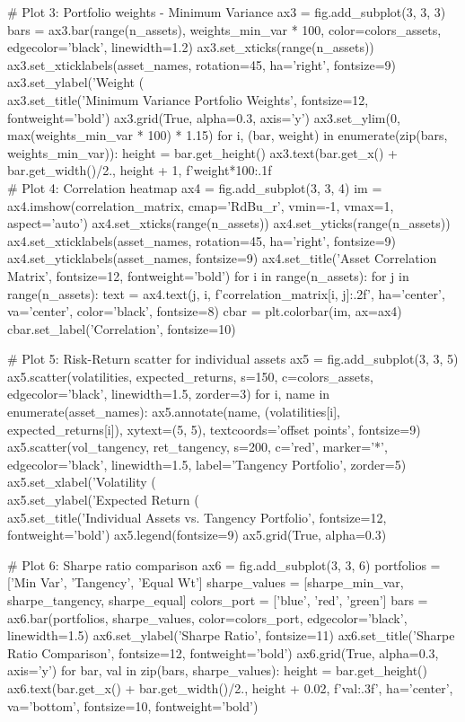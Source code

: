 \documentclass[a4paper, 11pt]{article}
\begin{document}
\begin{pycode}
# Plot 3: Portfolio weights - Minimum Variance
ax3 = fig.add_subplot(3, 3, 3)
bars = ax3.bar(range(n_assets), weights_min_var * 100, color=colors_assets,
              edgecolor='black', linewidth=1.2)
ax3.set_xticks(range(n_assets))
ax3.set_xticklabels(asset_names, rotation=45, ha='right', fontsize=9)
ax3.set_ylabel('Weight (\\%
ax3.set_title('Minimum Variance Portfolio Weights', fontsize=12, fontweight='bold')
ax3.grid(True, alpha=0.3, axis='y')
ax3.set_ylim(0, max(weights_min_var * 100) * 1.15)
for i, (bar, weight) in enumerate(zip(bars, weights_min_var)):
    height = bar.get_height()
    ax3.text(bar.get_x() + bar.get_width()/2., height + 1,
            f'{weight*100:.1f}\\%

# Plot 4: Correlation heatmap
ax4 = fig.add_subplot(3, 3, 4)
im = ax4.imshow(correlation_matrix, cmap='RdBu_r', vmin=-1, vmax=1, aspect='auto')
ax4.set_xticks(range(n_assets))
ax4.set_yticks(range(n_assets))
ax4.set_xticklabels(asset_names, rotation=45, ha='right', fontsize=9)
ax4.set_yticklabels(asset_names, fontsize=9)
ax4.set_title('Asset Correlation Matrix', fontsize=12, fontweight='bold')
for i in range(n_assets):
    for j in range(n_assets):
        text = ax4.text(j, i, f'{correlation_matrix[i, j]:.2f}',
                       ha='center', va='center', color='black', fontsize=8)
cbar = plt.colorbar(im, ax=ax4)
cbar.set_label('Correlation', fontsize=10)

# Plot 5: Risk-Return scatter for individual assets
ax5 = fig.add_subplot(3, 3, 5)
ax5.scatter(volatilities, expected_returns, s=150, c=colors_assets,
           edgecolor='black', linewidth=1.5, zorder=3)
for i, name in enumerate(asset_names):
    ax5.annotate(name, (volatilities[i], expected_returns[i]),
                xytext=(5, 5), textcoords='offset points', fontsize=9)
ax5.scatter(vol_tangency, ret_tangency, s=200, c='red', marker='*',
           edgecolor='black', linewidth=1.5, label='Tangency Portfolio', zorder=5)
ax5.set_xlabel('Volatility (\\%
ax5.set_ylabel('Expected Return (\\%
ax5.set_title('Individual Assets vs. Tangency Portfolio', fontsize=12, fontweight='bold')
ax5.legend(fontsize=9)
ax5.grid(True, alpha=0.3)

# Plot 6: Sharpe ratio comparison
ax6 = fig.add_subplot(3, 3, 6)
portfolios = ['Min Var', 'Tangency', 'Equal Wt']
sharpe_values = [sharpe_min_var, sharpe_tangency, sharpe_equal]
colors_port = ['blue', 'red', 'green']
bars = ax6.bar(portfolios, sharpe_values, color=colors_port, edgecolor='black', linewidth=1.5)
ax6.set_ylabel('Sharpe Ratio', fontsize=11)
ax6.set_title('Sharpe Ratio Comparison', fontsize=12, fontweight='bold')
ax6.grid(True, alpha=0.3, axis='y')
for bar, val in zip(bars, sharpe_values):
    height = bar.get_height()
    ax6.text(bar.get_x() + bar.get_width()/2., height + 0.02,
            f'{val:.3f}', ha='center', va='bottom', fontsize=10, fontweight='bold')


\end{pycode}
\end{document}
